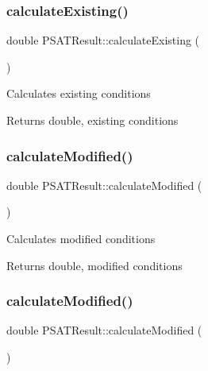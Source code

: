 \subsubsection{\texorpdfstring{calculate\+Existing()}{calculateExisting()}\hspace{0.1cm}{\footnotesize\ttfamily [3/3]}}
{\footnotesize\ttfamily double P\+S\+A\+T\+Result\+::calculate\+Existing (\begin{DoxyParamCaption}{ }\end{DoxyParamCaption})}

Calculates existing conditions \begin{DoxyReturn}{Returns}
double, existing conditions 
\end{DoxyReturn}
\mbox{\label{class_p_s_a_t_result_afbb68257a28c1b853d26faf3227461cc}} 
\subsubsection{\texorpdfstring{calculate\+Modified()}{calculateModified()}\hspace{0.1cm}{\footnotesize\ttfamily [1/3]}}
{\footnotesize\ttfamily double P\+S\+A\+T\+Result\+::calculate\+Modified (\begin{DoxyParamCaption}{ }\end{DoxyParamCaption})}

Calculates modified conditions \begin{DoxyReturn}{Returns}
double, modified conditions 
\end{DoxyReturn}
\mbox{\label{class_p_s_a_t_result_afbb68257a28c1b853d26faf3227461cc}} 
\subsubsection{\texorpdfstring{calculate\+Modified()}{calculateModified()}\hspace{0.1cm}{\footnotesize\ttfamily [2/3]}}
{\footnotesize\ttfamily double P\+S\+A\+T\+Result\+::calculate\+Modified (\begin{DoxyParamCaption}{ }\end{DoxyParamCaption})}

